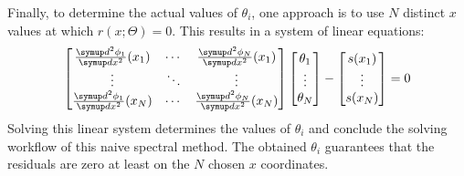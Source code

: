 Finally, to determine the actual values of $\theta_i$, one approach is to use $N$ distinct $x$ values at which $r(x; \Theta) = 0$.
This results in a system of linear equations: 
\begin{equation}\label{eq:spectral-linear-sys}
    \begin{bmatrix}
        \frac{\diff^2 \phi_1}{\diff x^2}(x_1) & \cdots & \frac{\diff^2 \phi_N}{\diff x^2}(x_1) \\
        \vdots & \ddots & \vdots \\
        \frac{\diff^2 \phi_1}{\diff x^2}(x_N) & \cdots & \frac{\diff^2 \phi_N}{\diff x^2}(x_N) \\
    \end{bmatrix}
    \begin{bmatrix}
        \theta_1 \\ \vdots \\ \theta_N
    \end{bmatrix}
    - 
    \begin{bmatrix}
        s(x_1) \\ \vdots \\ s(x_N)
    \end{bmatrix}
    = 0
\end{equation}
Solving this linear system determines the values of $\theta_i$ and conclude the solving workflow of this naive spectral method.
The obtained $\theta_i$ guarantees that the residuals are zero at least on the $N$ chosen $x$ coordinates.

